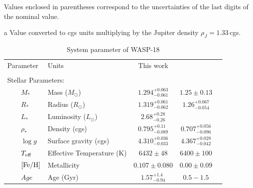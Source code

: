 \begin{landscape}
\begin{ThreePartTable}
\begin{TableNotes}
\item Values enclosed in parentheses correspond to the uncertainties of the last digits of the nominal value.
\item[a] Value converted to cgs units multiplying by the Jupiter density $\rho_{J}=1.33\,$cgs.
\end{TableNotes}
\begin{longtable}{llccc}
\caption{System parameter of WASP-18}
\label{wasp18}
\centering
\tabularnewline
\hline 
Parameter & Units & This work & \cite{Hellier2009} & \cite{Shporer2018} \\
\hline
\smallskip\\\multicolumn{2}{l}{Stellar Parameters:}&\smallskip\\
~~~~$M_*$\dotfill &Mass (\(M_\odot\))\dotfill &$1.294^{+0.063}_{-0.061}$ & $1.25\pm0.13$ &  \\
~~~~$R_*$\dotfill &Radius (\(R_\odot\))\dotfill &$1.319^{+0.061}_{-0.062}$ &$1.26^{+0.067}_{-0.054}$ & \\
~~~~$L_*$\dotfill &Luminosity (\(L_\odot\))\dotfill &$2.68^{+0.28}_{-0.26}$ & &\\
~~~~$\rho_*$\dotfill &Density (cgs)\dotfill &$0.795^{+0.11}_{-0.089}$ & $ 0.707^{+0.056}_{-0.096}$&\\
~~~~$\log{g}$\dotfill & Surface gravity (cgs)\dotfill &$4.310^{+0.036}_{-0.033}$ &$4.367^{+0.028}_{-0.042}$ & \\
~~~~$T_{\rm eff}$\dotfill &Effective Temperature (K)\dotfill &$6432\pm48$ & $6400\pm100$& \\
~~~~$[{\rm Fe/H}]$\dotfill &Metallicity \dotfill &$0.107\pm0.080$ & $0.00\pm0.09$ & \\
~~~~$Age$\dotfill &Age (Gyr)\dotfill &$1.57^{+1.4}_{-0.94}$ & $0.5-1.5$ & \\


\end{longtable}
\end{ThreePartTable}
\end{landscape}
